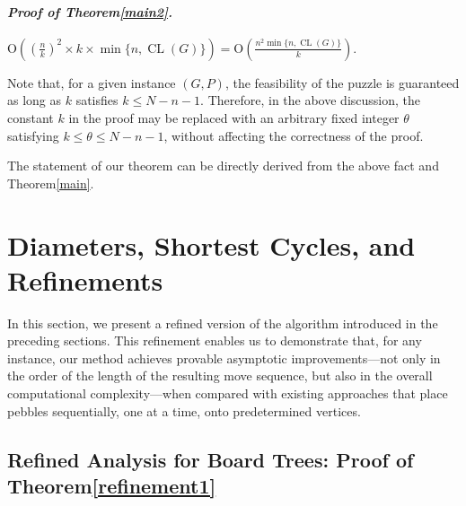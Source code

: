 \documentclass[letter,11pt]{article}
\newcommand{\white}{\qquad{\framebox{\rule{0pt}{4pt}}}}
\newcommand{\owari}{\hfill\white}
\theoremstyle{definition}
\theoremstyle{definition}
\DeclareMathOperator{\CL}{CL}
\newcommand{\1}{\boldmath$~1~$\unboldmath}
\newcommand{\Ord}{\mathrm{O}}
\newcommand{\qedgo}{\vspace{0.35cm}}
\newcommand{\tume}{\hspace*{0.2em}}
\newenvironment{Proofof}[1]{\expandafter
\paragraph{{\it Proof of #1.}}}{\hspace{5mm}\owari\qedgo}
\begin{document}
\begin{Proofof}{Theorem\tume\ref{main2}}
$\Ord((\frac{n}{k})^2 \times k \times \min\{n,\CL(G)\})=\Ord(\frac{n^2\min\{n,\CL(G)\}}{k})$.

Note that, for a given instance $(G, P)$, the feasibility of the puzzle is guaranteed as long as 
$k$ satisfies $k \leq N - n - 1$. 
Therefore, in the above discussion, the constant $k$ in the proof may be replaced with an arbitrary 
fixed integer $\theta$ satisfying $k \leq \theta \leq N - n - 1$, without affecting the correctness of the proof.

The statement of our theorem can be directly derived from the above fact and Theorem\tume\ref{main}. 
\end{Proofof}

\section{Diameters, Shortest Cycles, and Refinements}\label{refinement}

In this section, we present a refined version of the algorithm introduced in the preceding sections.
This refinement enables us to demonstrate that, for any instance, our method achieves provable asymptotic improvements—not only in the order
of the length of the resulting move sequence, but also in the overall computational complexity—when compared with existing approaches that
place pebbles sequentially, one at a time, onto predetermined vertices.

\subsection{Refined Analysis for Board Trees: Proof of Theorem\tume\ref{refinement1}}\label{refinement-tree}
\end{document}
